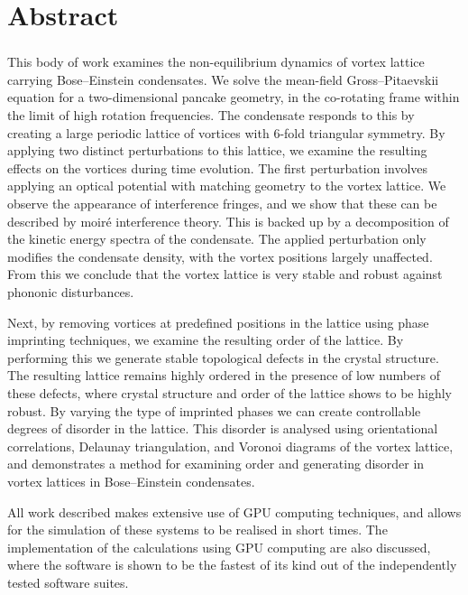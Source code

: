 \chapter*{Abstract}
\subsection*{\thesistitle}

This body of work examines the non-equilibrium dynamics of vortex lattice carrying Bose--Einstein condensates. We solve the mean-field Gross--Pitaevskii equation for a two-dimensional pancake geometry, in the co-rotating frame within the limit of high rotation frequencies. The condensate responds to this by creating a large periodic lattice of vortices with 6-fold triangular symmetry. By applying two distinct perturbations to this lattice, we examine the resulting effects on the vortices during time evolution. The first perturbation involves applying an optical potential with matching geometry to the vortex lattice. We observe the appearance of interference fringes, and we show that these can be described by moir\'e interference theory. This is backed up by a decomposition of the kinetic energy spectra of the condensate. The applied perturbation only modifies the condensate density, with the vortex positions largely unaffected. From this we conclude that the vortex lattice is very stable and robust against phononic disturbances.

Next, by removing vortices at predefined positions in the lattice using phase imprinting techniques, we examine the resulting order of the lattice. By performing this we generate stable topological defects in the crystal structure.  The resulting lattice remains highly ordered in the presence of low numbers of these defects, where crystal structure and order of the lattice shows to be highly robust. By varying the type of imprinted phases we can create controllable degrees of disorder in the lattice. This disorder is analysed using orientational correlations, Delaunay triangulation, and Voronoi diagrams of the vortex lattice, and demonstrates a method for examining order and generating disorder in vortex lattices in Bose--Einstein condensates.

All work described makes extensive use of GPU computing techniques, and allows for the simulation of these systems to be realised in short times. The implementation of the calculations using GPU computing are also discussed, where the software is shown to be the fastest of its kind out of the independently tested software suites. 
